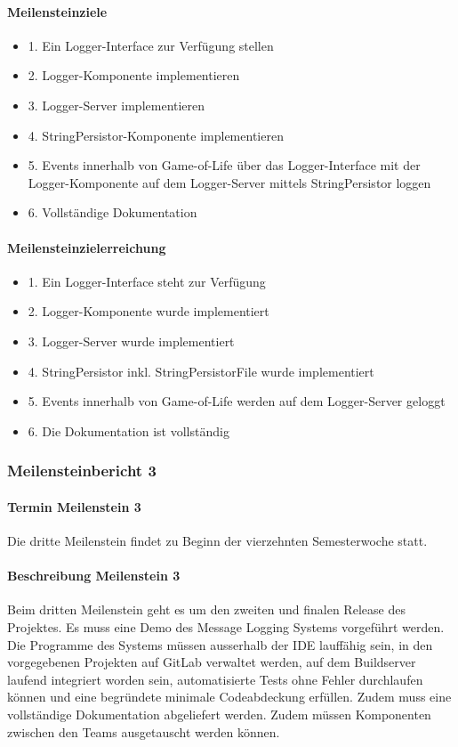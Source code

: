 \documentclass[11pt]{article}
\begin{document}
\paragraph{Meilensteinziele}
\begin{itemize}
	\itemsep0pt
	\item 1. Ein Logger-Interface zur Verfügung stellen
	\item 2. Logger-Komponente implementieren
	\item 3. Logger-Server implementieren
	\item 4. StringPersistor-Komponente implementieren
	\item 5. Events innerhalb von Game-of-Life über das Logger-Interface mit der Logger-Komponente auf dem	Logger-Server mittels StringPersistor loggen
	\item 6. Vollständige Dokumentation
\end{itemize}

\paragraph{Meilensteinzielerreichung}
\begin{itemize}
	\itemsep0pt
	\item 1. Ein Logger-Interface steht zur Verfügung
	\item 2. Logger-Komponente wurde implementiert
	\item 3. Logger-Server wurde implementiert
	\item 4. StringPersistor inkl. StringPersistorFile wurde implementiert
	\item 5. Events innerhalb von Game-of-Life werden auf dem Logger-Server geloggt
	\item 6. Die Dokumentation ist vollständig
\end{itemize}


\subsubsection{Meilensteinbericht 3}

\paragraph{Termin Meilenstein 3}
Die dritte Meilenstein findet zu Beginn der vierzehnten Semesterwoche statt.

\paragraph{Beschreibung Meilenstein 3}
Beim dritten Meilenstein geht es um den zweiten und finalen Release des Projektes. Es muss eine Demo des
Message Logging Systems vorgeführt werden. Die Programme des Systems müssen ausserhalb der
IDE lauffähig sein, in den vorgegebenen Projekten auf GitLab verwaltet werden, auf dem Buildserver
laufend integriert worden sein, automatisierte Tests ohne Fehler durchlaufen können und eine
begründete minimale Codeabdeckung erfüllen. Zudem muss eine vollständige Dokumentation
abgeliefert werden. Zudem müssen Komponenten zwischen den Teams ausgetauscht werden können.
\end{document}
